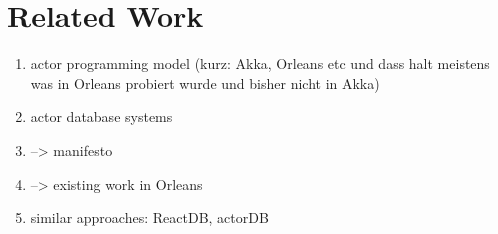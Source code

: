 
\section{Related Work}

\begin{enumerate}
  \item actor programming model (kurz: Akka, Orleans etc und dass halt meistens was in Orleans probiert wurde und bisher nicht in Akka)
  \item actor database systems
  \item --> manifesto
  \item --> existing work in Orleans
  \item similar approaches: ReactDB, actorDB
\end{enumerate}